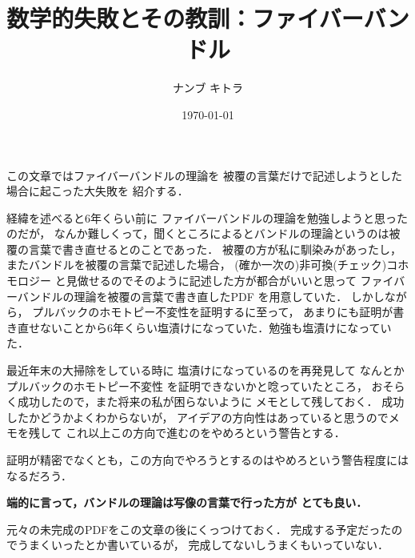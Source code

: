 \documentclass[leqno]{jsarticle}
\title{数学的失敗とその教訓：ファイバーバンドル}
\author{ナンブ キトラ}
\date{\today}
\begin{document}
\maketitle

この文章ではファイバーバンドルの理論を
被覆の言葉だけで記述しようとした場合に起こった大失敗を
紹介する．

経緯を述べると6年くらい前に
ファイバーバンドルの理論を勉強しようと思ったのだが，
なんか難しくって，聞くところによるとバンドルの理論というのは被覆の言葉で書き直せるとのことであった．
被覆の方が私に馴染みがあったし，
またバンドルを被覆の言葉で記述した場合，
(確か一次の)非可換(チェック)コホモロジー
と見做せるのでそのように記述した方が都合がいいと思って
ファイバーバンドルの理論を被覆の言葉で書き直したPDF
を用意していた．
しかしながら，
プルバックのホモトピー不変性を証明するに至って，
あまりにも証明が書き直せないことから6年くらい塩漬けになっていた．勉強も塩漬けになっていた．

最近年末の大掃除をしている時に
塩漬けになっているのを再発見して
なんとかプルバックのホモトピー不変性
を証明できないかと唸っていたところ，
おそらく成功したので，また将来の私が困らないように
メモとして残しておく．
成功したかどうかよくわからないが，
アイデアの方向性はあっていると思うのでメモを残して
これ以上この方向で進むのをやめろという警告とする．

証明が精密でなくとも，この方向でやろうとするのはやめろという警告程度にはなるだろう．

\textbf{端的に言って，バンドルの理論は写像の言葉で行った方が
とても良い．}

元々の未完成のPDFをこの文章の後にくっつけておく．
完成する予定だったのでうまくいったとか書いているが，
完成してないしうまくもいっていない．
\end{document}
